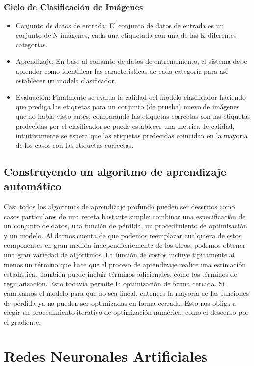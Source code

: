 \documentclass[a4paper,11pt,spanish]{book}
\begin{document}
	\subsubsection {Ciclo de Clasificación de Imágenes}
	  \begin{itemize}
	    \item Conjunto de datos de entrada: El conjunto de datos de entrada es un conjunto de N imágenes, cada una etiquetada con una de las K diferentes categorias.
	    \item Aprendizaje: En base al conjunto de datos de entrenamiento, el sistema debe aprender como identificar las caracteristicas de cada categoría para asi establecer un modelo clasificador.
	    \item Evaluación: Finalmente se evalua la calidad del modelo clasificador haciendo que prediga las etiquetas para un conjunto (de prueba) nuevo de imágenes que no habia visto antes, comparando las
	    etiquetas correctas con las etiquetas predecidas por el clasificador se puede establecer una metrica de calidad, intuitivamente se espera que las etiquetas predecidas coincidan en la mayoria
	    de los casos con las etiquetas correctas.
	  \end{itemize}
\fi


    \subsection{Construyendo un algoritmo de aprendizaje automático}
      Casi todos los algoritmos de aprendizaje profundo pueden ser descritos como casos particulares de una receta bastante simple:
      combinar una especificación de un conjunto de datos, una función de pérdida, un procedimiento de optimización y un modelo.
      Al darnos cuenta de que podemos reemplazar cualquiera de estos componentes en gran medida independientemente de los otros, podemos obtener una gran variedad de algoritmos.
      La función de costos incluye típicamente al menos un término que hace que el proceso de aprendizaje realice una estimación estadística. También puede incluir términos adicionales,
      como los términos de regularización. Esto todavía permite la optimización de forma cerrada.
      Si cambiamos el modelo para que no sea lineal, entonces la mayoría de las funciones de pérdida ya no pueden ser optimizadas en forma cerrada.
      Esto nos obliga a elegir un procedimiento iterativo de optimización numérica, como el descenso por el gradiente.

    \section{Redes Neuronales Artificiales}\label{sec:redes_neuronales}
\end{document}
